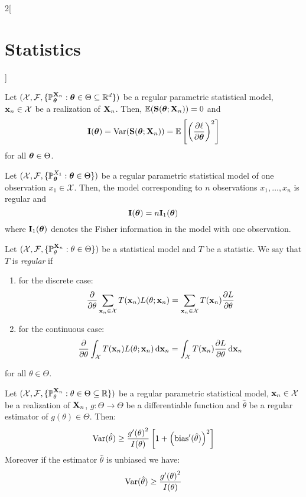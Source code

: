\documentclass[../../../main.tex]{subfiles}
\begin{document}
\begin{multicols}{2}[\section{Statistics}]
  \begin{proposition}
    Let $(\mathcal{X},\mathcal{F},\{\mathbb{P}_{\boldsymbol{\mathrm{\theta}}}^{\boldsymbol{\mathrm{X}}_n}:\boldsymbol{\mathrm{\theta}}\in\Theta\subseteq\mathbb{R}^d\})$ be a regular parametric statistical model, $\boldsymbol{\mathrm{x}}_n\in\mathcal{X}$ be a realization of $\boldsymbol{\mathrm{X}}_n$. Then, $\operatorname{\mathbb{E}}(\boldsymbol{\mathrm{S}}(\boldsymbol{\mathrm{\theta}};\boldsymbol{\mathrm{X}}_n))=0$ and $$\boldsymbol{\mathrm{I}}(\boldsymbol{\mathrm{\theta}})=\operatorname{Var}(\boldsymbol{\mathrm{S}}(\boldsymbol{\mathrm{\theta}};\boldsymbol{\mathrm{X}}_n))=\operatorname{\mathbb{E}}\left[{\left(\pdv{\ell}{\boldsymbol{\mathrm{\theta}}}(\boldsymbol{\mathrm{\theta}};\boldsymbol{\mathrm{X}}_n)\right)}^2\right]$$
    for all $\boldsymbol{\mathrm{\theta}}\in\Theta$.
  \end{proposition}
  \begin{proposition}
    Let $(\mathcal{X},\mathcal{F},\{\mathbb{P}_{\boldsymbol{\mathrm{\theta}}}^{X_1}:\boldsymbol{\mathrm{\theta}}\in\Theta\})$ be a regular parametric statistical model of one observation $x_1\in \mathcal{X}$. Then, the model corresponding to $n$ \iid observations $x_1,\ldots,x_n$ is regular and $$\boldsymbol{\mathrm{I}}(\boldsymbol{\mathrm{\theta}})=n \boldsymbol{\mathrm{I}}_1(\boldsymbol{\mathrm{\theta}})$$
    where $\boldsymbol{\mathrm{I}}_1(\boldsymbol{\mathrm{\theta}})$ denotes the Fisher information in the model with one observation.
  \end{proposition}
  \begin{definition}
    Let $(\mathcal{X},\mathcal{F},\{\mathbb{P}_{\theta}^{\boldsymbol{\mathrm{X}}_n}:\theta\in\Theta\})$ be a statistical model and $T$ be a statistic. We say that $T$ is \emph{regular} if
    \begin{enumerate}
      \item for the discrete case: $$\pdv{}{\theta}\sum_{\boldsymbol{\mathrm{x}}_n\in\mathcal{X}}T(\boldsymbol{\mathrm{x}}_n)L(\theta;\boldsymbol{\mathrm{x}}_n)=\sum_{\boldsymbol{\mathrm{x}}_n\in\mathcal{X}}T(\boldsymbol{\mathrm{x}}_n)\pdv{L}{\theta}(\theta;\boldsymbol{\mathrm{x}}_n)$$
      \item for the continuous case: $$\pdv{}{\theta}\int_{\mathcal{X}}T(\boldsymbol{\mathrm{x}}_n)L(\theta;\boldsymbol{\mathrm{x}}_n)\dd{\boldsymbol{\mathrm{x}}_n}=\int_{\mathcal{X}}T(\boldsymbol{\mathrm{x}}_n)\pdv{L}{\theta}(\theta;\boldsymbol{\mathrm{x}}_n)\dd{\boldsymbol{\mathrm{x}}_n}$$
    \end{enumerate}
    for all $\theta\in\Theta$.
  \end{definition}
  \begin{theorem}
    Let $(\mathcal{X}, \mathcal{F}, \{\mathbb{P}_{\theta}^{\boldsymbol{\mathrm{X}}_n}: \theta\in\Theta\subseteq\mathbb{R}\})$ be a regular parametric statistical model, $\boldsymbol{\mathrm{x}}_n\in\mathcal{X}$ be a realization of $\boldsymbol{\mathrm{X}}_n$, $g:\Theta\rightarrow\Theta$ be a differentiable function and ${\hat\theta}$ be a regular estimator of $g({\theta})\in\Theta$. Then: $$\operatorname{Var}(\hat\theta)\geq \frac{{g'(\theta)}^2}{I(\theta) }\left[1+{\left(\operatorname{bias}'(\hat\theta)\right)}^2\right]$$ Moreover if the estimator $\hat\theta$ is unbiased we have: $$\operatorname{Var}(\hat\theta)\geq \frac{{g'(\theta)}^2}{I(\theta)}$$
  \end{theorem}

\end{multicols}
\end{document}
